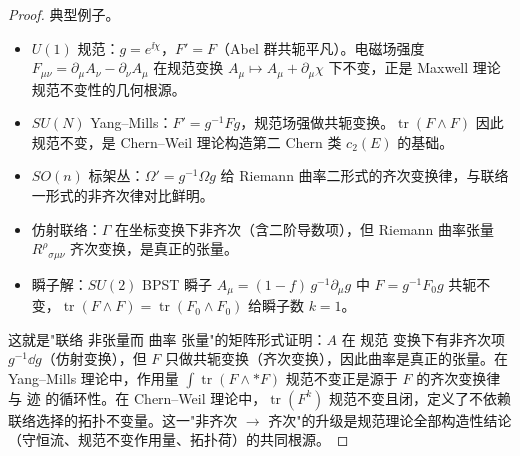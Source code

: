 \begin{proof}
典型例子。
\begin{itemize}
\item $U(1)$ 规范：$g=e^{\ii\chi}$，$F'=F$（Abel 群共轭平凡）。电磁场强度 $F_{\mu\nu}=\partial_\mu A_\nu-\partial_\nu A_\mu$ 在规范变换 $A_\mu\mapsto A_\mu+\partial_\mu\chi$ 下不变，正是 Maxwell 理论规范不变性的几何根源。
\item $SU(N)$ Yang--Mills：$F'=g^{-1}Fg$，规范场强做共轭变换。$\operatorname{tr}(F\wedge F)$ 因此规范不变，是 Chern--Weil 理论构造第二 Chern 类 $c_2(E)$ 的基础。
\item $SO(n)$ 标架丛：$\Omega'=g^{-1}\Omega g$ 给 Riemann 曲率二形式的齐次变换律，与联络一形式的非齐次律对比鲜明。
\item 仿射联络：$\Gamma$ 在坐标变换下非齐次（含二阶导数项），但 Riemann 曲率张量 $R^\rho{}_{\sigma\mu\nu}$ 齐次变换，是真正的张量。
\item 瞬子解：$SU(2)$ BPST 瞬子 $A_\mu=(1-f)\,g^{-1}\partial_\mu g$ 中 $F=g^{-1}F_0g$ 共轭不变，$\operatorname{tr}(F\wedge F)=\operatorname{tr}(F_0\wedge F_0)$ 给瞬子数 $k=1$。
\end{itemize}

这就是"联络 非张量而 曲率 张量"的矩阵形式证明：$A$ 在 规范 变换下有非齐次项 $g^{-1}\dd g$（仿射变换），但 $F$ 只做共轭变换（齐次变换），因此曲率是真正的张量。在 Yang--Mills 理论中，作用量 $\int\operatorname{tr}(F\wedge *F)$ 规范不变正是源于 $F$ 的齐次变换律与 迹 的循环性。在 Chern--Weil 理论中，$\operatorname{tr}(F^k)$ 规范不变且闭，定义了不依赖联络选择的拓扑不变量。这一"非齐次 $\to$ 齐次"的升级是规范理论全部构造性结论（守恒流、规范不变作用量、拓扑荷）的共同根源。
\end{proof}

